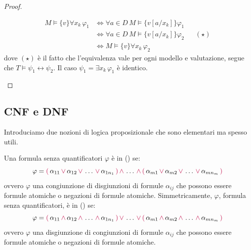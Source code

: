 \begin{proof}
\begin{itemize}
\begin{align*}
            M \models \{v\} \forall x_k \, \varphi_1 &\iff \forall a \in D \, M \models \{v[a/x_k]\} \varphi_1\\
                                                     &\iff \forall a \in D \, M \models \{v[a/x_k]\} \varphi_2 &&(\star)\\
                                                     &\iff M \models \{v\} \forall x_k \, \varphi_2
        \end{align*} 
        dove $(\star)$ è il fatto che l'equivalenza vale per ogni modello e valutazione, segue che $T \models \psi_1 \leftrightarrow \psi_2$. Il caso $\psi_1 = \exists x_k \, \varphi_1$ è identico.
    \end{itemize}
\end{proof}

\subsection{CNF e DNF}

Introduciamo due nozioni di logica proposizionale che sono elementari ma spesso utili.

\begin{definition}
    Una formula \textcolor{green!50!black}{senza quantificatori} $\varphi$ è in  () se:
    \[ \varphi = \textcolor{purple}{(}\, \alpha_{11} \, \textcolor{purple}{\lor} \, \alpha_{12} \, \textcolor{purple}{\lor} \, \dots \, \textcolor{purple}{\lor} \, \alpha_{1n_1} \, \textcolor{purple}{)} \, \textcolor{purple}{\land} \, \dots \, \textcolor{purple}{\land} \, \textcolor{purple}{(}\, \alpha_{m1} \, \textcolor{purple}{\lor} \, \alpha_{m2} \, \textcolor{purple}{\lor} \, \dots \, \textcolor{purple}{\lor} \, \alpha_{mn_m} \, \textcolor{purple}{)}
    \]
    ovvero $\varphi$ una congiunzione di disgiunzioni di formule $\alpha_{ij}$ che possono essere formule atomiche o negazioni di formule atomiche. Simmetricamente,
    $\varphi$, formula \textcolor{green!50!black}{senza quantificatori}, è in  () se:
    \[ \varphi = \textcolor{purple}{(}\, \alpha_{11} \, \textcolor{purple}{\land} \, \alpha_{12} \, \textcolor{purple}{\land} \, \dots \, \textcolor{purple}{\land} \, \alpha_{1n_1} \, \textcolor{purple}{)} \, \textcolor{purple}{\lor} \, \dots \, \textcolor{purple}{\lor} \, \textcolor{purple}{(}\, \alpha_{m1} \, \textcolor{purple}{\land} \, \alpha_{m2} \, \textcolor{purple}{\land} \, \dots \, \textcolor{purple}{\land} \, \alpha_{mn_m} \, \textcolor{purple}{)}
    \]
    ovvero $\varphi$ una disgiunzione di congiunzioni di formule $\alpha_{ij}$ che possono essere formule atomiche o negazioni di formule atomiche.
\end{definition}

